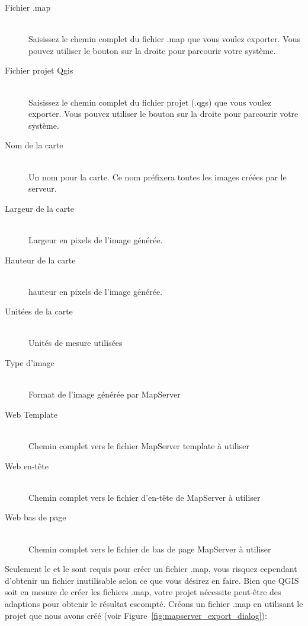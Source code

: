 \begin{description}
\item [Fichier .map] \mbox{}\\Saisissez le chemin complet du fichier .map que vous voulez exporter. Vous pouvez utiliser le bouton sur la droite pour parcourir votre système.
\item [Fichier projet Qgis] \mbox{}\\Saisissez le chemin complet du fichier projet (.qgs) que vous voulez exporter. Vous pouvez utiliser le bouton sur la droite pour parcourir votre système.
\item [Nom de la carte] \mbox{}\\Un nom pour la carte. Ce nom préfixera toutes les images créées par le serveur.
\item [Largeur de la carte] \mbox{}\\Largeur en pixels de l'image générée.
\item [Hauteur de la carte] \mbox{}\\hauteur en pixels de l'image générée.
\item [Unitées de la carte] \mbox{}\\Unités de mesure utilisées
\item [Type d'image] \mbox{}\\Format de l'image générée par MapServer
\item [Web Template] \mbox{}\\Chemin complet vers le fichier MapServer template à utiliser
\item [Web en-tête] \mbox{}\\Chemin complet vers le fichier d'en-tête de MapServer à utiliser
\item [Web bas de page] \mbox{}\\Chemin complet vers le fichier de bas de page MapServer à utiliser
\end{description}


Seulement le  et le  sont requis pour créer un fichier .map, vous risquez cependant d'obtenir un fichier inutilisable selon ce que vous désirez en faire. Bien que QGIS soit en mesure de créer les fichiers .map, votre projet nécessite peut-être des adaptions pour obtenir le résultat escompté. Créons un fichier .map en utilisant le projet  que nous avons créé (voir Figure~\ref{fig:mapserver_export_dialog}):

